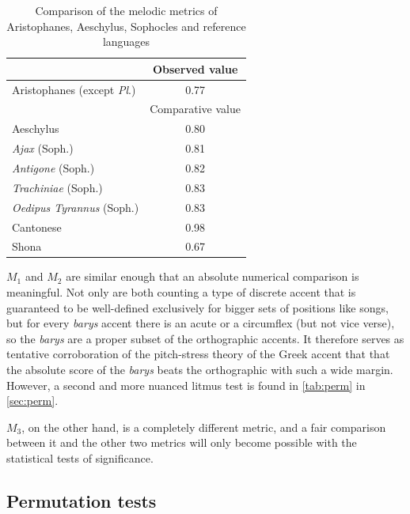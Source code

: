 \documentclass[twoside]{article}
\begin{document}
\begin{table}[ht]
    \centering
    \begin{tabular}{l c}
        \hline
                                           & Observed value \\
        \hline
        Aristophanes (except \textit{Pl}.)& 0.77 \\
        \hline
                                           & Comparative value \\
        \hline
        Aeschylus                         & 0.80 \\
        \textit{Ajax} (Soph.)               & 0.81 \\
        \textit{Antigone} (Soph.)          & 0.82 \\
        \textit{Trachiniae} (Soph.)         & 0.83 \\
        \textit{Oedipus Tyrannus} (Soph.)    & 0.83 \\
        Cantonese                         & 0.98 \\
        Shona                             & 0.67 \\
        \hline
    \end{tabular}
    \caption{Comparison of the melodic metrics of Aristophanes, Aeschylus, Sophocles and reference languages}
    \label{tab:m3-results-no-pl}
\end{table}

$M_1$ and $M_2$ are similar enough that an absolute numerical comparison is meaningful.  Not only are both counting a type of discrete accent that is guaranteed to be well-defined exclusively for bigger sets of positions like songs, but for every \textit{barys} accent there is an acute or a circumflex (but not vice verse), so the \textit{barys} are a proper subset of the orthographic accents. It therefore serves as tentative corroboration of the pitch-stress theory of the Greek accent that that the absolute score of the \textit{barys} beats the orthographic with such a wide margin. However, a second and more nuanced litmus test is found in \autoref{tab:perm} in \autoref{sec:perm}.

$M_3$, on the other hand, is a completely different metric, and a fair comparison between it and the other two metrics will only become possible with the statistical tests of significance.

\subsection{Permutation tests}\label{sec:perm}
\end{document}
